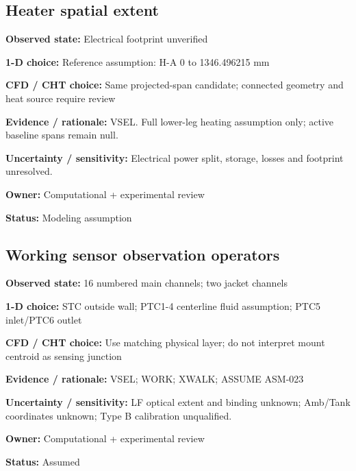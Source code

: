 \documentclass[11pt]{article}
\begin{document}
\par\noindent\begin{minipage}{\textwidth}\small\setlength{\parskip}{2pt}
\subsection*{Heater spatial extent}
\textbf{Observed state:} Electrical footprint unverified\par
\textbf{1-D choice:} Reference assumption: H-A 0 to 1346.496215 mm\par
\textbf{CFD / CHT choice:} Same projected-span candidate; connected geometry and heat source require review\par
\textbf{Evidence / rationale:} VSEL. Full lower-leg heating assumption only; active baseline spans remain null.\par
\textbf{Uncertainty / sensitivity:} Electrical power split, storage, losses and footprint unresolved.\par
\textbf{Owner:} Computational + experimental review\par
\textbf{Status:} Modeling assumption\par
\end{minipage}\par\vspace{5pt}
\par\noindent\begin{minipage}{\textwidth}\small\setlength{\parskip}{2pt}
\subsection*{Working sensor observation operators}
\textbf{Observed state:} 16 numbered main channels; two jacket channels\par
\textbf{1-D choice:} STC outside wall; PTC1-4 centerline fluid assumption; PTC5 inlet/PTC6 outlet\par
\textbf{CFD / CHT choice:} Use matching physical layer; do not interpret mount centroid as sensing junction\par
\textbf{Evidence / rationale:} VSEL; WORK; XWALK; ASSUME ASM-023\par
\textbf{Uncertainty / sensitivity:} LF optical extent and binding unknown; Amb/Tank coordinates unknown; Type B calibration unqualified.\par
\textbf{Owner:} Computational + experimental review\par
\textbf{Status:} Assumed\par
\end{minipage}\par\vspace{5pt}
\end{document}
